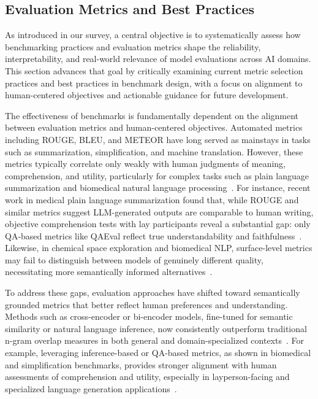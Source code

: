 \documentclass[sigconf]{acmart}
\begin{document}
\subsection{Evaluation Metrics and Best Practices}

As introduced in our survey, a central objective is to systematically assess how benchmarking practices and evaluation metrics shape the reliability, interpretability, and real-world relevance of model evaluations across AI domains. This section advances that goal by critically examining current metric selection practices and best practices in benchmark design, with a focus on alignment to human-centered objectives and actionable guidance for future development.

The effectiveness of benchmarks is fundamentally dependent on the alignment between evaluation metrics and human-centered objectives. Automated metrics including ROUGE, BLEU, and METEOR have long served as mainstays in tasks such as summarization, simplification, and machine translation. However, these metrics typically correlate only weakly with human judgments of meaning, comprehension, and utility, particularly for complex tasks such as plain language summarization and biomedical natural language processing~\cite{ref76,ref81,ref91,ref94,ref101,ref104,ref106}. For instance, recent work in medical plain language summarization found that, while ROUGE and similar metrics suggest LLM-generated outputs are comparable to human writing, objective comprehension tests with lay participants reveal a substantial gap: only QA-based metrics like QAEval reflect true understandability and faithfulness~\cite{ref81}. Likewise, in chemical space exploration and biomedical NLP, surface-level metrics may fail to distinguish between models of genuinely different quality, necessitating more semantically informed alternatives~\cite{ref91,ref94}.

To address these gaps, evaluation approaches have shifted toward semantically grounded metrics that better reflect human preferences and understanding. Methods such as cross-encoder or bi-encoder models, fine-tuned for semantic similarity or natural language inference, now consistently outperform traditional n-gram overlap measures in both general and domain-specialized contexts~\cite{ref76,ref91,ref94}. For example, leveraging inference-based or QA-based metrics, as shown in biomedical and simplification benchmarks, provides stronger alignment with human assessments of comprehension and utility, especially in layperson-facing and specialized language generation applications~\cite{ref76,ref81,ref94,ref106}.
\end{document}
